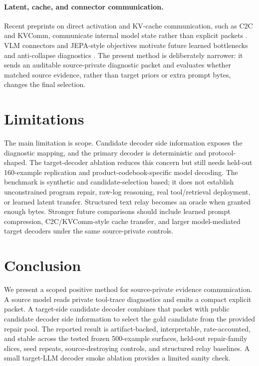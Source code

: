 \documentclass{article}
\begin{document}
\paragraph{Latent, cache, and connector communication.}
Recent preprints on direct activation and KV-cache communication, such as C2C
and KVComm, communicate internal model state rather than explicit packets
\citep{fu2025c2c,shi2025kvcomm}. VLM connectors and JEPA-style objectives
motivate future learned bottlenecks and anti-collapse diagnostics
\citep{alayrac2022flamingo,li2023blip2,assran2023ijepa,bardes2021vicreg}.
The present method is deliberately narrower: it sends an auditable
source-private diagnostic packet and evaluates whether matched source evidence,
rather than target priors or extra prompt bytes, changes the final selection.

\section{Limitations}

The main limitation is scope. Candidate decoder side information exposes the
diagnostic mapping, and the primary decoder is deterministic and
protocol-shaped. The target-decoder ablation reduces this concern but still
needs held-out 160-example replication and product-codebook-specific model
decoding. The benchmark is synthetic and candidate-selection based; it does not
establish unconstrained program repair, raw-log reasoning, real tool/retrieval
deployment, or learned latent transfer. Structured text relay becomes an oracle
when granted enough bytes. Stronger future comparisons should include learned
prompt compression, C2C/KVComm-style cache transfer, and larger model-mediated
target decoders under the same source-private controls.

\section{Conclusion}

We present a scoped positive method for source-private evidence communication.
A source model reads private tool-trace diagnostics and emits a compact explicit
packet. A target-side candidate decoder combines that packet with public
candidate decoder side information to select the gold candidate from the
provided repair pool.
The reported result is artifact-backed, interpretable, rate-accounted, and
stable across the tested frozen 500-example surfaces, held-out repair-family
slices, seed repeats, source-destroying controls, and structured relay
baselines. A small target-LLM decoder smoke ablation provides a limited sanity
check.
\end{document}

